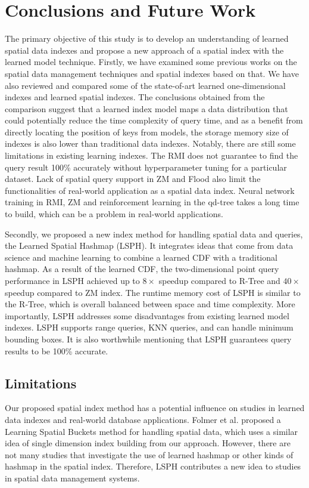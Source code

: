 \chapter{Conclusions and Future Work}
The primary objective of this study is to develop an understanding of learned spatial data indexes and propose a new approach of a spatial index with the learned model technique. Firstly, we have examined some previous works on the spatial data management techniques and spatial indexes based on that. We have also reviewed and compared some of the state-of-art learned one-dimensional indexes and learned spatial indexes. The conclusions obtained from the comparison suggest that a learned index model maps a data distribution that could potentially reduce the time complexity of query time, and as a benefit from directly locating the position of keys from models, the storage memory size of indexes is also lower than traditional data indexes. Notably, there are still some limitations in existing learning indexes. The RMI does not guarantee to find the query result 100\% accurately without hyperparameter tuning for a particular dataset. Lack of spatial query support in ZM and Flood also limit the functionalities of real-world application as a spatial data index. Neural network training in RMI, ZM and reinforcement learning in the qd-tree takes a long time to build, which can be a problem in real-world applications. 

Secondly, we proposed a new index method for handling spatial data and queries, the Learned Spatial Hashmap (LSPH). It integrates ideas that come from data science and machine learning to combine a learned CDF with a traditional hashmap. As a result of the learned CDF, the two-dimensional point query performance in LSPH achieved up to $8\times$ speedup compared to R-Tree and  $40\times$ speedup compared to ZM index.  The runtime memory cost of LSPH is similar to the R-Tree, which is overall balanced between space and time complexity. More importantly, LSPH addresses some disadvantages from existing learned model indexes. LSPH supports range queries, KNN queries, and can handle minimum bounding boxes. It is also worthwhile mentioning that LSPH guarantees query results to be 100\% accurate. 

\section{Limitations}
Our proposed spatial index method has a potential influence on studies in learned data indexes and real-world database applications. Folmer et al. \cite{Folmer:vg} proposed a Learning Spatial Buckets method for handling spatial data, which uses a similar idea of single dimension index building from our approach. However, there are not many studies that investigate the use of learned hashmap or other kinds of hashmap in the spatial index. Therefore, LSPH contributes a new idea to studies in spatial data management systems. 

